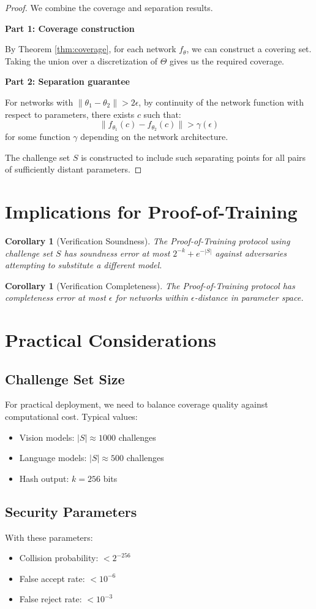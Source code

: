 \documentclass[11pt]{article}
\theoremstyle{plain}
\newtheorem{corollary}[theorem]{Corollary}
\theoremstyle{definition}
\theoremstyle{remark}
\begin{document}
\begin{proof}
We combine the coverage and separation results.

\textbf{Part 1: Coverage construction}

By Theorem \ref{thm:coverage}, for each network $f_\theta$, we can construct 
a covering set. Taking the union over a discretization of $\Theta$ gives us 
the required coverage.

\textbf{Part 2: Separation guarantee}

For networks with $\|\theta_1 - \theta_2\| > 2\epsilon$, by continuity of 
the network function with respect to parameters, there exists $c$ such that:
$$\|f_{\theta_1}(c) - f_{\theta_2}(c)\| > \gamma(\epsilon)$$
for some function $\gamma$ depending on the network architecture.

The challenge set $S$ is constructed to include such separating points for 
all pairs of sufficiently distant parameters.
\end{proof}

\section{Implications for Proof-of-Training}

\begin{corollary}[Verification Soundness]
The Proof-of-Training protocol using challenge set $S$ has soundness error 
at most $2^{-k} + e^{-|S|}$ against adversaries attempting to substitute a 
different model.
\end{corollary}

\begin{corollary}[Verification Completeness]
The Proof-of-Training protocol has completeness error at most $\epsilon$ for 
networks within $\epsilon$-distance in parameter space.
\end{corollary}

\section{Practical Considerations}

\subsection{Challenge Set Size}
For practical deployment, we need to balance coverage quality against 
computational cost. Typical values:
\begin{itemize}
    \item Vision models: $|S| \approx 1000$ challenges
    \item Language models: $|S| \approx 500$ challenges
    \item Hash output: $k = 256$ bits
\end{itemize}

\subsection{Security Parameters}
With these parameters:
\begin{itemize}
    \item Collision probability: $< 2^{-256}$
    \item False accept rate: $< 10^{-6}$
    \item False reject rate: $< 10^{-3}$
\end{itemize}
\end{document}
